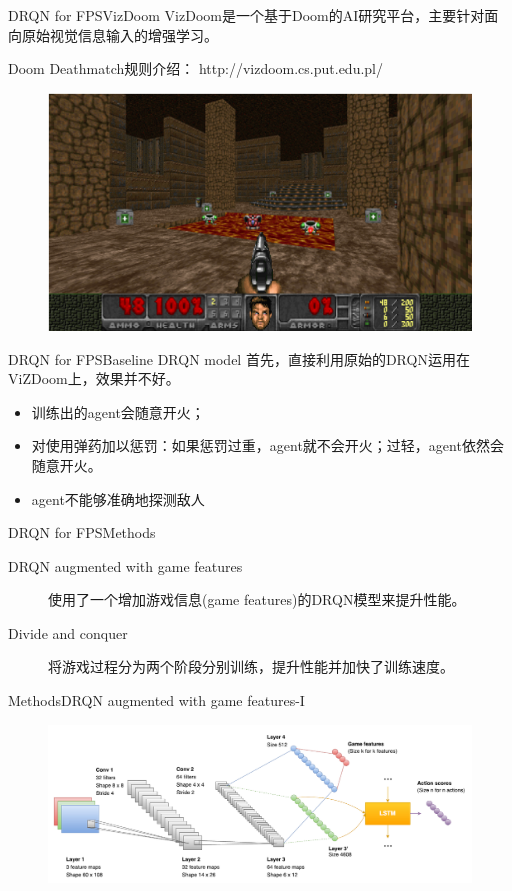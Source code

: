 \documentclass[10pt]{beamer}
\begin{document}
	\begin{frame}{DRQN for FPS}{VizDoom}
		VizDoom是一个基于Doom的AI研究平台，主要针对面向原始视觉信息输入的增强学习。
		
		Doom Deathmatch规则介绍：
		http://vizdoom.cs.put.edu.pl/
		
		\begin{figure}
			\centering
			\includegraphics[width=0.8\linewidth]{pictures/deathmatch}
		\end{figure}
	\end{frame}

	\begin{frame}{DRQN for FPS}{Baseline DRQN model}
		首先，直接利用原始的DRQN运用在ViZDoom上，效果并不好。
		\begin{itemize}
			\item 训练出的agent会随意开火；
			\item 对使用弹药加以惩罚：如果惩罚过重，agent就不会开火；过轻，agent依然会随意开火。
			\item agent不能够准确地探测敌人
		\end{itemize}
		
	\end{frame}

	\begin{frame}{DRQN for FPS}{Methods}
		\begin{description}
			\item[DRQN augmented with game features] 
			使用了一个增加游戏信息(game features)的DRQN模型来提升性能。
			
			\item[Divide and conquer]
			将游戏过程分为两个阶段分别训练，提升性能并加快了训练速度。
			
		\end{description}
	\end{frame}

	\begin{frame}{Methods}{DRQN augmented with game features-I}
		\begin{figure}
			\centering
			\includegraphics[width=0.7\linewidth]{pictures/drqn-with-game-features}
		\end{figure}
		
	\end{frame}
\end{document}
